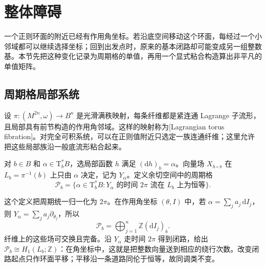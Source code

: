 
% 
% 

\section{整体障碍}
\label{g4:sec:1103}

一个正则环面的附近已经有作用角坐标。若沿底空间移动这个环面，每经过一个小邻域都可以继续选择坐标；回到出发点时，原来的基本闭路却可能变成另一组整数基。本节先把这种变化记录为周期格的单值，再用一个显式粘合构造算出非平凡的单值矩阵。

\subsection{周期格局部系统}
\label{g4:subsec:1103:01}
设 \(\pi:(M^{2n},\omega)\to B^n\) 是光滑满秩映射，每条纤维都是紧连通 Lagrange 子流形，且局部具有前节构造的作用角邻域。这样的映射称为[Lagrangian torus fibration]。对完全可积系统，可以在正则值附近只选定一族连通纤维；这里允许把这些局部族沿一般底流形粘合起来。

\begin{definition}\label{g4:def:1103:period-covectors}
	对 \(b\in B\) 和 \(\alpha\in\mathrm{T}_b^*B\)，选局部函数 \(h\) 满足 \((\mathrm{d}h)_b=\alpha\)。向量场 \(X_{h\circ\pi}\) 在 \(L_b=\pi^{-1}(b)\) 上只由 \(\alpha\) 决定，记为 \(Y_\alpha\)。定义余切空间中的周期格
	\[
		\mathcal P_b=\{\alpha\in\mathrm{T}_b^*B:\text{\(Y_\alpha\) 的时间 \(2\pi\) 流在 \(L_b\) 上为恒等}\}.
	\]
\end{definition}

这个定义把周期统一归一化为 \(2\pi\)。在作用角坐标 \((\theta,I)\) 中，若 \(\alpha=\sum_j a_j\,\mathrm{d}I_j\)，则 \(Y_\alpha=\sum_j a_j\partial_{\theta_j}\)，所以
\begin{equation}\label{g4:eq:1103:period-frame}
	\mathcal P_b=\bigoplus_{j=1}^n\mathbb Z(\mathrm{d}I_j)_b.
\end{equation}
纤维上的这些场可交换且完备。沿 \(Y_\alpha\) 走时间 \(2\pi\) 得到闭路，给出 \(\mathcal P_b\cong H_1(L_b;\mathbb Z)\)：在角坐标中，这就是把整数向量送到相应的绕行次数。改变闭路起点只作环面平移；平移沿一条道路同伦于恒等，故同调类不变。

